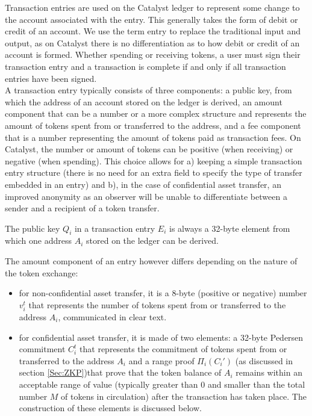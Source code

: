Transaction entries are used on the Catalyst ledger to represent some change to the account associated with the entry. This generally takes the form of debit or credit of an account. We use the term entry to replace the traditional input and output, as on Catalyst there is no differentiation as to how debit or credit of an account is formed. Whether spending or receiving tokens, a user must sign their transaction entry and a transaction is complete if and only if all transaction entries have been signed.\\

 A transaction entry typically consists of three components: a public key, from which the address of an account stored on the ledger is derived, an amount component that can be a number or a more complex structure and represents the amount of tokens spent from or transferred to the address, and a fee component that is a number representing the amount of tokens paid as transaction fees. On Catalyst, the number  or amount of tokens can be positive (when receiving) or negative (when spending). This  choice allows for a) keeping a simple transaction entry structure (there is no need for an extra field to specify the type of transfer embedded in an entry) and b), in the case of confidential asset transfer, an improved anonymity as an observer will be unable to differentiate between a sender and a recipient of a token transfer. 

The public key $Q_i$ in a transaction entry $E_i$ is always a 32-byte element from which one address $A_i$ stored on the ledger can be derived. 

The amount component of an entry however differs depending on the nature of the token exchange:

\begin{itemize}
\item for non-confidential asset transfer, it is a 8-byte (positive or negative) number $v^t_i$ that represents the number of tokens spent from or transferred to the address $A_i$, communicated in clear text.
\item for confidential asset transfer, it is made of two elements: a 32-byte Pedersen commitment $C_{i}^{t}$ that represents the commitment of tokens spent from or transferred to the address $A_i$ and a range proof $\Pi_i(C_{i}')$ (as discussed in section \ref{Sec:ZKP})that prove that the token balance of $A_i$ remains within an acceptable range of value (typically greater than 0 and smaller than the total number $M$ of tokens in circulation) after the transaction has taken place. The construction of these elements is discussed below. 
\end{itemize}

